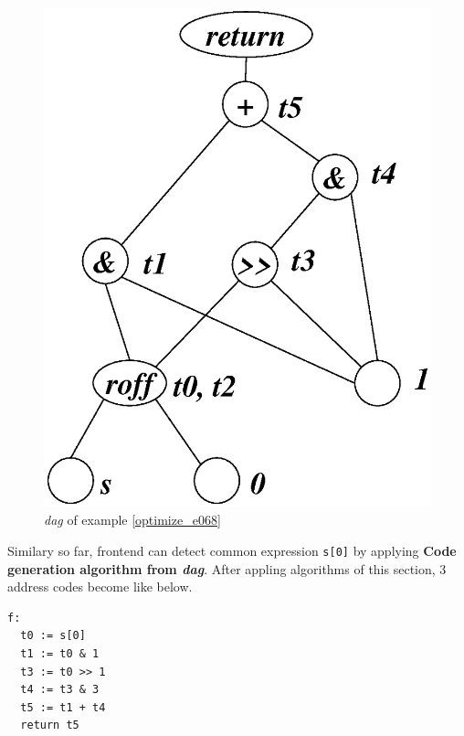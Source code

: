 \begin{Example}
\begin{figure}[htbp]
\begin{center}
\begin{latexonly}
\includegraphics[width=0.826\linewidth,height=1.0\linewidth]{opt028.eps}
\end{latexonly}
\caption{{\em dag} of example \ref{optimize_e068}}
\label{optimize_e069}
\end{center}
\end{figure}
Similary so far, frontend can detect common expression {\tt{s[0]}}
by applying {\bf Code generation algorithm from {\em dag}}.
After appling algorithms of this section,
3 address codes become like below.
\begin{verbatim}
f:
  t0 := s[0]
  t1 := t0 & 1
  t3 := t0 >> 1
  t4 := t3 & 3
  t5 := t1 + t4
  return t5
\end{verbatim}
\end{Example}

